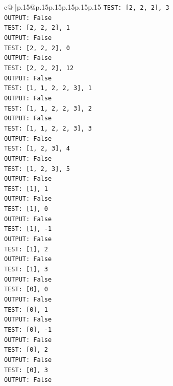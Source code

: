 \documentclass{article}
\begin{document}
{\begin{supertabular}{c@{$\;$}|p{.15\linewidth}@{}p{.15\linewidth}p{.15\linewidth}p{.15\linewidth}p{.15\linewidth}p{.15\linewidth}}
{{{\texttt{TEST: {[}2, 2, 2{]}, 3} \\
\texttt{OUTPUT: False} \\
\texttt{TEST: {[}2, 2, 2{]}, 1} \\
\texttt{OUTPUT: False} \\
\texttt{TEST: {[}2, 2, 2{]}, 0} \\
\texttt{OUTPUT: False} \\
\texttt{TEST: {[}2, 2, 2{]}, 12} \\
\texttt{OUTPUT: False} \\
\texttt{TEST: {[}1, 1, 2, 2, 3{]}, 1} \\
\texttt{OUTPUT: False} \\
\texttt{TEST: {[}1, 1, 2, 2, 3{]}, 2} \\
\texttt{OUTPUT: False} \\
\texttt{TEST: {[}1, 1, 2, 2, 3{]}, 3} \\
\texttt{OUTPUT: False} \\
\texttt{TEST: {[}1, 2, 3{]}, 4} \\
\texttt{OUTPUT: False} \\
\texttt{TEST: {[}1, 2, 3{]}, 5} \\
\texttt{OUTPUT: False} \\
\texttt{TEST: {[}1{]}, 1} \\
\texttt{OUTPUT: False} \\
\texttt{TEST: {[}1{]}, 0} \\
\texttt{OUTPUT: False} \\
\texttt{TEST: {[}1{]}, {-}1} \\
\texttt{OUTPUT: False} \\
\texttt{TEST: {[}1{]}, 2} \\
\texttt{OUTPUT: False} \\
\texttt{TEST: {[}1{]}, 3} \\
\texttt{OUTPUT: False} \\
\texttt{TEST: {[}0{]}, 0} \\
\texttt{OUTPUT: False} \\
\texttt{TEST: {[}0{]}, 1} \\
\texttt{OUTPUT: False} \\
\texttt{TEST: {[}0{]}, {-}1} \\
\texttt{OUTPUT: False} \\
\texttt{TEST: {[}0{]}, 2} \\
\texttt{OUTPUT: False} \\
\texttt{TEST: {[}0{]}, 3} \\
\texttt{OUTPUT: False} \\
}}}
\end{supertabular}}
\end{document}
